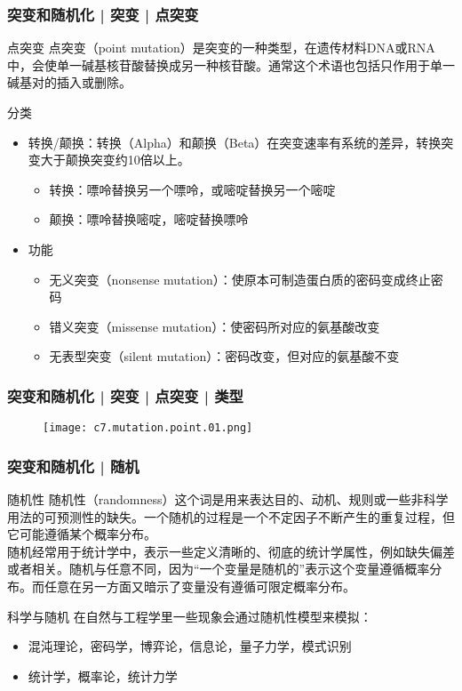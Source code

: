 \begin{frame}
  \frametitle{突变和随机化 | 突变 | \alert{点突变}}
  \begin{block}{点突变}
 点突变（point mutation）是突变的一种类型，在遗传材料DNA或RNA中，会使单一碱基核苷酸替换成另一种核苷酸。通常这个术语也包括只作用于单一碱基对的插入或删除。 
  \end{block}
  \pause
  \begin{block}{分类}
    \begin{itemize}
      \item 转换/颠换：转换（Alpha）和颠换（Beta）在突变速率有系统的差异，转换突变大于颠换突变约10倍以上。
	\begin{itemize}
	  \item 转换：嘌呤替换另一个嘌呤，或嘧啶替换另一个嘧啶
	  \item 颠换：嘌呤替换嘧啶，嘧啶替换嘌呤
	\end{itemize}
      \item 功能
	\begin{itemize}
	  \item 无义突变（nonsense mutation）：使原本可制造蛋白质的密码变成终止密码
	  \item 错义突变（missense mutation）：使密码所对应的氨基酸改变
	  \item 无表型突变（silent mutation）：密码改变，但对应的氨基酸不变
	\end{itemize}
    \end{itemize}
  \end{block}
\end{frame}

\begin{frame}
  \frametitle{突变和随机化 | 突变 | 点突变 | 类型}
  \begin{figure}
    \centering
    \texttt{[image: c7.mutation.point.01.png]}
  \end{figure}
\end{frame}

\begin{frame}
  \frametitle{突变和随机化 | 随机}
  \begin{block}{随机性}
    随机性（randomness）这个词是用来表达目的、动机、规则或一些非科学用法的可预测性的缺失。一个随机的过程是一个不定因子不断产生的重复过程，但它可能遵循某个概率分布。\\
    \vspace{1em}
    随机经常用于统计学中，表示一些定义清晰的、彻底的统计学属性，例如缺失偏差或者相关。随机与任意不同，因为“一个变量是随机的”表示这个变量遵循概率分布。而任意在另一方面又暗示了变量没有遵循可限定概率分布。
  \end{block}
  \pause
  \begin{block}{科学与随机}
    在自然与工程学里一些现象会通过随机性模型来模拟：
    \begin{itemize}
      \item 混沌理论，密码学，博弈论，信息论，量子力学，模式识别
      \item 统计学，概率论，统计力学
    \end{itemize}
  \end{block}
\end{frame}

